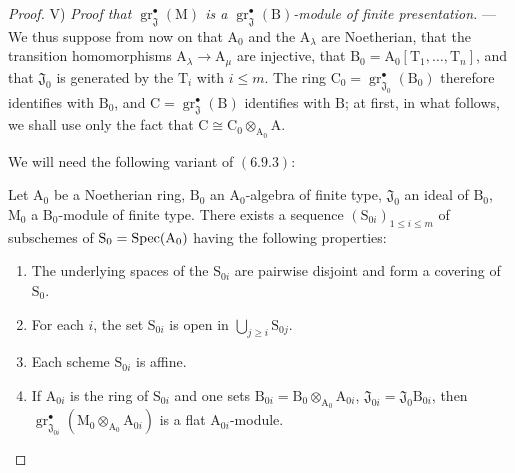 \begin{proof}
\medskip
\noindent V) \emph{Proof that $\operatorname{gr}^\bullet_\mathfrak{J}(\mathrm{M})$ is a $\operatorname{gr}^\bullet_\mathfrak{J}(\mathrm{B})$-module of finite presentation.} --- We thus suppose from now on that $\mathrm{A}_0$ and the $\mathrm{A}_\lambda$ are Noetherian, that the transition homomorphisms $\mathrm{A}_\lambda\to\mathrm{A}_\mu$ are injective, that $\mathrm{B}_0=\mathrm{A}_0[\mathrm{T}_1,\ldots,\mathrm{T}_n]$, and that $\mathfrak{J}_0$ is generated by the $\mathrm{T}_i$ with $i\leqslant m$. The ring $\mathrm{C}_0=\operatorname{gr}^\bullet_{\mathfrak{J}_0}(\mathrm{B}_0)$ therefore identifies with $\mathrm{B}_0$, and $\mathrm{C}=\operatorname{gr}^\bullet_\mathfrak{J}(\mathrm{B})$ identifies with $\mathrm{B}$; at first, in what follows, we shall use only the fact that $\mathrm{C}\cong\mathrm{C}_0\otimes_{\mathrm{A}_0}\mathrm{A}$.

We will need the following variant of $(6.9.3)$:

\begin{lemma}[11.2.9.5]
\label{IV.11.2.9.5}
Let $\mathrm{A}_0$ be a Noetherian ring, $\mathrm{B}_0$ an
$\mathrm{A}_0$-algebra of finite type, $\mathfrak{J}_0$ an ideal of
$\mathrm{B}_0$, $\mathrm{M}_0$ a $\mathrm{B}_0$-module of finite type. There
exists a sequence $(\mathrm{S}_{0i})_{1\leqslant i\leqslant m}$ of
subschemes of $\mathrm{S}_0=\operatorname{Spec}(\mathrm{A}_0)$ having the following
properties:
\begin{enumerate}[label=\textup{\arabic{enumi}}\textsuperscript{o}]
  \item The underlying spaces of the $\mathrm{S}_{0i}$ are pairwise disjoint and form a covering of $\mathrm{S}_0$.
  \item For each $i$, the set $\mathrm{S}_{0i}$ is open in $\bigcup_{j\geqslant i}\mathrm{S}_{0j}$.
  \item Each scheme $\mathrm{S}_{0i}$ is affine.
  \item If $\mathrm{A}_{0i}$ is the ring of $\mathrm{S}_{0i}$ and one sets $\mathrm{B}_{0i}=\mathrm{B}_0\otimes_{\mathrm{A}_0}\mathrm{A}_{0i}$, $\mathfrak{J}_{0i}=\mathfrak{J}_0\mathrm{B}_{0i}$, then $\operatorname{gr}^\bullet_{\mathfrak{J}_{0i}}(\mathrm{M}_0\otimes_{\mathrm{A}_0}\mathrm{A}_{0i})$ is a flat $\mathrm{A}_{0i}$-module.
\end{enumerate}
\end{lemma}


\end{proof}
